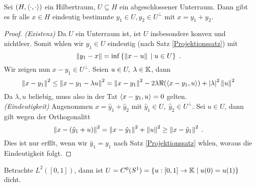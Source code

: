	\begin{theorem}
		Sei \((H, \left\langle\cdot, \cdot\right\rangle)\) ein Hilbertraum, \(U\subseteq H\) ein abgeschlossener Unterraum.  Dann gibt es f\us r alle \(x\in H\) eindeutig bestimmte \(y_1 \in U, y_2 \in U^\perp\) mit \(x = y_1 + y_2\).
	\end{theorem}
	\begin{proof}
		\textit{(Existenz)} Da \(U\) ein Unterraum ist, ist $U$ insbesondere konvex und nichtleer. Somit w\as hlen wir \(y_1 \in U\) eindeutig (nach Satz \ref{Projektionssatz}) mit
		\[\left\lVert y_1 -x\right\rVert = \inf\left\{\left\lVert x-u\right\rVert\;\vert\; u \in U\right\}\;.\]
		Wir zeigen nun \(x-y_1 \in U^\perp\). Seien \(u\in U,\; \lambda \in \mathbb{K}\), dann 
		\[\left\lVert x-y_1\right\rVert^2 \leq \left\lVert x-y_1 -\lambda u\right\rVert^2 = \left\lVert x-y_1\right\rVert^2 -2 \lambda\Re(\left\langle x-y_1, u\right\rangle) + \left\lvert \lambda \right\rvert^2 \left\lVert u\right\rVert^2\]
		Da \(\lambda, u\) beliebig, muss also in der Tat \(\left\langle x-y_1,u\right\rangle = 0\) gelten.\\
		\textit{(Eindeutigkeit)} Angenommen \(x = \hat y_1 + \hat y_2\) mit \(\hat y_1 \in U,\; \hat y_2 \in U^\perp\). Sei \(u \in U\), dann gilt wegen der Orthogonalit\as t
		\[\left\lVert x-(\hat y_1 +u)\right\rVert^2 = \left\lVert x-\hat y_1\right\rVert^2 + \left\lVert u\right\rVert^2 \geq \left\lVert x-\hat y_1\right\rVert^2\;.\]
		Dies ist nur erf\us llt, wenn wir \(\hat y_1 = y_1\) nach Satz  \ref{Projektionssatz} w\as hlen, woraus die Eindeutigkeit folgt. 
	\end{proof}
	
	\begin{ex}
		Betrachte \(L^2([0,1])\), dann ist \(U = C^0(S^1) = \left\{u:[0,1]\to \mathbb{K}\;\vert\; u(0) = u(1)\right\}\) dicht.
	\end{ex}

